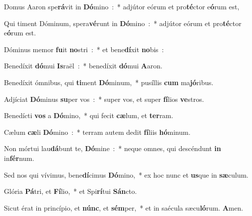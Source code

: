 \documentclass[letterpaper,12pt]{article} %
\begin{document}
\begin{parcolumns}[rulebetween,colwidths={1=267pt}]{2}
{\begin{psalmverses}[1]
\item Domus Aaron spe\textbf{rá}vit in \textbf{Dó}mino~:~* adjútor eórum et pro\textbf{té}ctor e\textbf{ó}rum est,
\item Qui timent Dóminum, spera\textbf{vé}runt in \textbf{Dó}mino~:~* adjútor eórum et pro\textbf{té}ctor e\textbf{ó}rum est.
\item Dóminus memor \textbf{fu}it \textbf{no}stri~:~* et bene\textbf{dí}xit \textbf{no}bis~:
\item Benedíxit \textbf{dó}mui \textbf{Is}raël~:~* benedíxit \textbf{dó}mui \textbf{A}aron.
\item Benedíxit ómnibus, qui \textbf{ti}ment \textbf{Dó}minum,~* pusíllis \textbf{cum} ma\textbf{jó}ribus.
\item Adjíciat \textbf{Dó}minus \textbf{su}per vos~:~* super vos, et super \textbf{fí}lios \textbf{ve}stros.
\item Benedícti \textbf{vos} a \textbf{Dó}mino,~* qui fecit \textbf{cæ}lum, et \textbf{ter}\-ram.
\item Cælum \textbf{cæ}li \textbf{Dó}mino~:~* terram autem dedit \textbf{fí}liis \textbf{hó}\-mi\-num.
\item Non mórtui lau\textbf{dá}bunt te, \textbf{Dó}mine~:~* neque omnes, qui descéndunt \textbf{in} in\textbf{fér}num.
\item Sed nos qui vívimus, bene\textbf{dí}cimus \textbf{Dó}mino,~* ex hoc nunc et \textbf{us}que in \textbf{sæ}culum.
\item Glória \textbf{Pá}tri, et \textbf{Fí}lio,~* et Spi\textbf{rí}tui \textbf{Sán}cto.
\item Sicut érat in princípio, et \textbf{núnc}, et \textbf{sém}per,~* et in saécula sæcu\textbf{ló}rum. \textbf{A}men.
\end{psalmverses}
}
\end{parcolumns}
\end{document}
